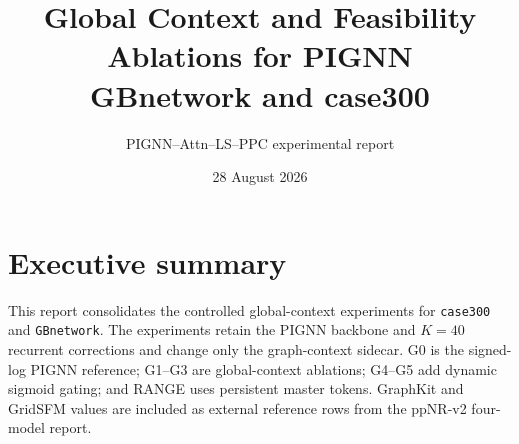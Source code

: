 \documentclass[10pt]{article}
\title{Global Context and Feasibility Ablations for PIGNN\\\large GBnetwork and case300}
\author{PIGNN--Attn--LS--PPC experimental report}
\date{28 August 2026}
\begin{document}
\maketitle

\section{Executive summary}

This report consolidates the controlled global-context experiments for
\texttt{case300} and \texttt{GBnetwork}.  The experiments retain the PIGNN
backbone and $K=40$ recurrent corrections and change only the graph-context
sidecar.  G0 is the signed-log PIGNN reference; G1--G3 are global-context
ablations; G4--G5 add dynamic sigmoid gating; and RANGE uses persistent master
tokens.  GraphKit and GridSFM values are included as external reference rows
from the ppNR-v2 four-model report.
\end{document}
